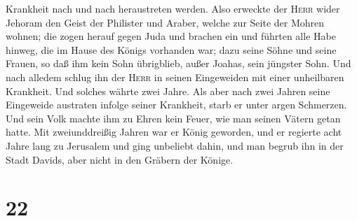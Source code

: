 Krankheit nach und nach heraustreten werden.  Also
erweckte der \textsc{Herr} wider Jehoram den Geist der Philister und
Araber, welche zur Seite der Mohren wohnen;  die zogen
herauf gegen Juda und brachen ein und führten alle Habe hinweg, die im
Hause des Königs vorhanden war; dazu seine Söhne und seine Frauen, so
daß ihm kein Sohn übrigblieb, außer Joahas, sein jüngster Sohn.
 Und nach alledem schlug ihn der \textsc{Herr} in seinen
Eingeweiden mit einer unheilbaren Krankheit.  Und solches
währte zwei Jahre. Als aber nach zwei Jahren seine Eingeweide austraten
infolge seiner Krankheit, starb er unter argen Schmerzen. Und sein Volk
machte ihm zu Ehren kein Feuer, wie man seinen Vätern getan hatte.
 Mit zweiunddreißig Jahren war er König geworden, und er
regierte acht Jahre lang zu Jerusalem und ging unbeliebt dahin, und man
begrub ihn in der Stadt Davids, aber nicht in den Gräbern der Könige.

\hypertarget{section-21}{%
\section{22}\label{section-21}}

